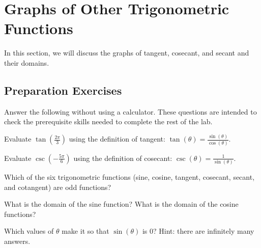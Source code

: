 
\section{Graphs of Other Trigonometric Functions} \label{section-graphs-of-other-trig-functions}
In this section, we will discuss the graphs of tangent, cosecant, and secant and their domains.


\subsection*{Preparation Exercises} \label{preparation-exercises-section-graphs-of-other-trig-functions}

Answer the following without using a calculator. These questions are intended to check the prerequisite skills needed to complete the rest of the lab.

\begin{myPrep}
	Evaluate $\tan\left(\frac{2\pi}{3}\right)$ using the definition of tangent: $\tan(\theta)=\frac{\sin(\theta)}{\cos(\theta)}$.
\end{myPrep}
\vfill

\begin{myPrep}
	Evaluate $\csc\left(-\frac{5\pi}{6}\right)$ using the definition of cosecant: $\csc(\theta)=\frac{1}{\sin(\theta)}$.
\end{myPrep}
\vfill

\begin{myPrep}
	Which of the six trigonometric functions (sine, cosine, tangent, cosecant, secant, and cotangent) are odd functions?
\end{myPrep}
\vfill

\begin{myPrep}
	What is the domain of the sine function? What is the domain of the cosine functions?
\end{myPrep}
\vfill

\begin{myPrep}
	Which values of $\theta$ make it so that $\sin(\theta)$ is $0$? Hint: there are infinitely many answers.
\end{myPrep}
\vfill


